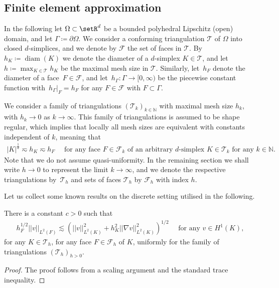 \documentclass[reqno,a4paper]{amsart}
\def\abs#1{\left| #1 \right|}
\def\norm#1{\left|\!\left| #1 \right|\!\right|}
\def\diam{\mathop{\mathrm{diam}}\nolimits} 		%
\def\tria{\mathcal{T}_h}
\def\faces{\mathcal{F}_h}
\begin{document}
\subsection{Finite element approximation}
\label{sec:prelim-fem}

In the following let $\Omega\subset \setR^d$ be a bounded polyhedral Lipschitz (open) domain, and let $\Gamma \coloneqq \partial \Omega$. 
% 
We consider a conforming triangulation $\mathcal{T}$ of $\Omega$ into closed $d$-simplices, and we denote by $\mathcal{F}$ the set of faces in $\mathcal{T}$. 
By $h_K \coloneqq \diam(K)$ we denote the diameter of a $d$-simplex $K \in \mathcal{T}$, and let $h \coloneqq \max_{K \in \mathcal{T}} h_K$ be the maximal mesh size in $\mathcal{T}$. 
Similarly, let~$h_F$ denote the diameter of a face~$F \in \mathcal{F}$, and let~$h_{\Gamma} \colon \Gamma \to [0,\infty)$ be the piecewise constant function with~$h_{\Gamma}|_{F} = h_F$ for any $F \in \mathcal{F}$ with $F \subset \Gamma$. 

We consider a family of triangulations $(\mathcal{T}_k)_{k \in \mathbb{N}}$ with maximal mesh size $h_k$, with $h_k \to 0$ as $k \to \infty$. 
This family of triangulations is assumed to be shape regular, which implies that locally all mesh sizes are equivalent with constants independent of $k$, meaning that
\begin{align*}
	\abs{K}^{\frac{1}{d}} \eqsim h_K \eqsim h_F
	\quad \text{ for any face $F \in \mathcal{F}_k$ of an arbitrary $d$-simplex $K \in \mathcal{T}_k$ for any $k \in \mathbb{N}$.} 
\end{align*}
Note that we do not assume quasi-uniformity. 
%
In the remaining section we shall write $h \to 0$ to represent the limit $k \to \infty$, and we  denote the respective triangulations by~$\tria$ and sets of faces $\tria$ by $\faces$ with index $h$.  

Let us collect some known results on the discrete setting utilised in the following. 

\begin{lemma}\label{lem:trace} 
	There is a constant $c>0$ such that 
	\begin{align*}
		h_F^{1/2} \norm{v}_{L^2(F)} 
		\lesssim
		\left(\norm{v}^2_{L^2(K)}
		+ h_K^2 \norm{\nabla v}^2_{L^2(K)}\right)^{1/2} \quad \text{ for any }v \in H^1(K), 
	\end{align*}
	for any $K \in \tria$, for any face $F \in \faces$ of $K$, uniformly for the family of triangulations $(\mathcal{T}_h)_{h>0}$. 
\end{lemma}
%
\begin{proof} The proof follows from a scaling argument and the standard trace inequality. 
\end{proof}
%
\end{document}
